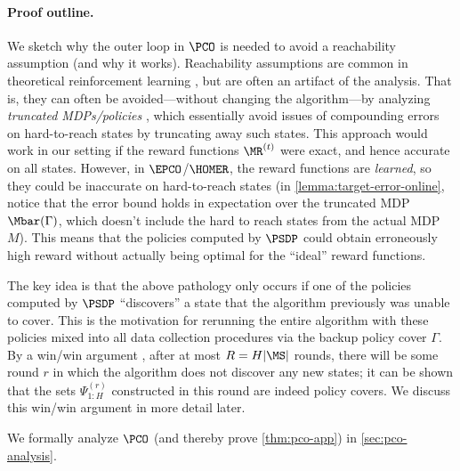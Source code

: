 \paragraph{Proof outline.} We sketch why the outer loop in $\PCO$ is needed to avoid a reachability assumption (and why it works). Reachability assumptions are common in theoretical reinforcement learning \citep{du2019provably,misra2020kinematic}, but are often an artifact of the analysis. That is, they can often be avoided---without changing the algorithm---by analyzing \emph{truncated MDPs/policies} \citep{golowich2022learning,mhammedi2023efficient}, which essentially avoid issues of compounding errors on hard-to-reach states by truncating away such states. This approach would work in our setting if the reward functions $\MR^{(t)}$ were exact, and hence accurate on all states. However, in $\EPCO$/$\HOMER$, the reward functions are \emph{learned}, so they could be inaccurate on hard-to-reach states (in \cref{lemma:target-error-online}, notice that the error bound holds in expectation over the truncated MDP $\Mbar(\Gamma)$, which doesn't include the hard to reach states from the actual MDP $M$). This means that the policies computed by $\PSDP$ could obtain erroneously high reward without actually being optimal for the ``ideal'' reward functions.

The key idea is that the above pathology only occurs if one of the policies computed by $\PSDP$ ``discovers'' a state that the algorithm previously was unable to cover. This is the motivation for rerunning the entire algorithm with these policies mixed into all data collection procedures via the backup policy cover $\Gamma$. By a win/win argument \citep{golowich2024exploring}, after at most $R = H|\MS|$ rounds, there will be some round $r$ in which the algorithm does not discover any new states; it can be shown that the sets $\Psi^{(r)}_{1:H}$ constructed in this round are indeed policy covers. We discuss this win/win argument in more detail later.

We formally analyze $\PCO$ (and thereby prove \cref{thm:pco-app}) in \cref{sec:pco-analysis}.

